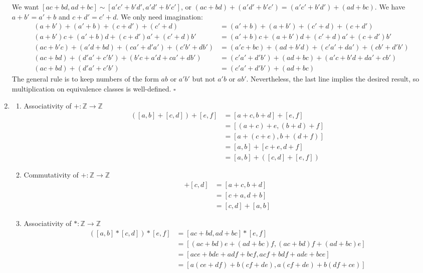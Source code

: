 \documentclass{article}
\begin{document}
\begin{enumerate}[label=\textbf{(\alph*)}]
{\begin{enumerate}[label=(\arabic*)]
{		We want
		$[ac+bd,ad+bc]\sim[a'c'+b'd',a'd'+b'c']$,
		or $(ac+bd)+(a'd'+b'c')=(a'c'+b'd')+(ad+bc)$.
		We have $a+b'=a'+b$ and $c+d'=c'+d$.
		We only need imagination:
		\begin{align*}
			(a+b')+(a'+b)+(c+d')+(c'+d) &= (a'+b)+(a+b')+(c'+d)+(c+d') \\
            (a+b')c+(a'+b)d+(c+d')a'+(c'+d)b'
           	     &= (a'+b)c+(a+b')d+(c'+d)a'+(c+d')b' \\
			(ac+b'c)+(a'd+bd)+(ca'+d'a')+(c'b'+db')
			     &= (a'c+bc)+(ad+b'd)+(c'a'+da')+ (cb'+d'b') \\
			(ac+bd)+(d'a'+c'b')+(b'c+a'd+ca'+db')
			 	 &= (c'a'+d'b')+(ad+bc)+(a'c+b'd+da'+cb') \\
		    (ac+bd)+(d'a'+c'b') &= (c'a'+d'b')+(ad+bc)
		\end{align*}
		The general rule is to keep numbers of the form
		$ab$ or $a'b'$ but not $a'b$ or $ab'$.
		Nevertheless, the last line implies the desired result,
		so multiplication on equivalence classes is
		well-defined.
		\hfill $\square$
	}
	\end{enumerate}
}
\item{
	\begin{enumerate}[label=(\arabic*)]
	\item{
		Associativity of $+:\mathbb{Z}\to\mathbb{Z}$
		\begin{align*}
			([a,b]+[c,d])+[e,f] &= [a+c,b+d]+[e,f]\\
				&= [(a+c)+e,(b+d)+f]\\
				&= [a+(c+e),b+(d+f)]\\
				&= [a,b]+[c+e,d+f]\\
				&= [a,b]+([c,d]+[e,f])
		\end{align*}
	}
	\item{
		Commutativity of $+:\mathbb{Z}\to\mathbb{Z}$
		\begin{align*}
			[a,b]+[c,d] &= [a+c,b+d]\\
				&=[c+a,d+b]\\
				&=[c,d]+[a,b]
		\end{align*}
	}
	\item{
		Associativity of $*:\mathbb{Z}\to\mathbb{Z}$
		\begin{align*}
			([a,b]*[c,d])*[e,f] &= [ac+bd,ad+bc]*[e,f]\\
				&= [(ac+bd)e+(ad+bc)f,(ac+bd)f+(ad+bc)e]\\
				&= [ace+bde+adf+bcf,acf+bdf+ade+bce]\\
				&= [a(ce+df)+b(cf+de),a(cf+de)+b(df+ce)]\\

\end{align*}}
\end{enumerate}}
\end{enumerate}
\end{document}
